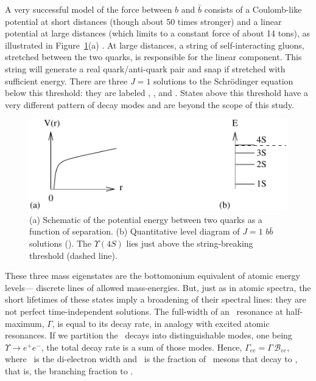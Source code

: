 \documentclass{cornell}
\begin{document}
A very successful model of the force between $b$ and $\bar{b}$
consists of a Coulomb-like potential at short distances (though about
50 times stronger) and a linear potential at large distances (which
limits to a constant force of about 14 tons), as illustrated in
Figure~\ref{cornellpotential}(a) \cite{cornellpotential}.  At large
distances, a string of self-interacting gluons, stretched between the
two quarks, is responsible for the linear component.  This string will
generate a real quark/anti-quark pair and snap if stretched with
sufficient energy.  There are three $J=1$ solutions to the
Schr\"odinger equation below this threshold: they are labeled \us,
\uss, and \usss.  States above this threshold have a very different
pattern of decay modes and are beyond the scope of this study.

\begin{figure}[p]
  \begin{center}
    \includegraphics[width=0.8\linewidth]{newnewplots/cornellpotential}
  \end{center}
  \caption[Bottomonium potential and energy
  eigenvalues]{\label{cornellpotential} (a) Schematic of the potential
  energy between two quarks as a function of separation.  (b)
  Quantitative level diagram of $J=1$ $b\bar{b}$ solutions (\ups).
  The $\Upsilon(4S)$ lies just above the string-breaking threshold
  (dashed line).}
\end{figure}

These three mass eigenstates are the bottomonium equivalent of atomic
energy levels--- discrete lines of allowed mass-energies.  But, just
as in atomic spectra, the short lifetimes of these states imply a
broadening of their spectral lines: they are not perfect
time-independent solutions.  The full-width of an \ups\ resonance at
half-maximum, $\Gamma$, is equal to its decay rate, in analogy with
excited atomic resonances.  If we partition the \ups\ decays into
distinguishable modes, one being $\Upsilon \to e^+e^-$, the total
decay rate is a sum of those modes.  Hence, $\Gamma_{ee} = \Gamma \,
{\mathcal B}_{ee}$, where \gee\ is the di-electron width and \bee\ is
the fraction of \ups\ mesons that decay to \ee, that is, the branching
fraction to \ee.
  
\end{document}
